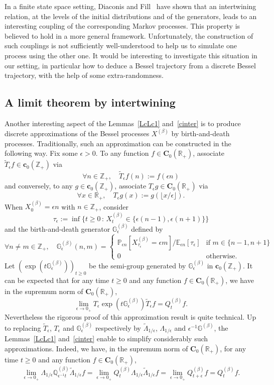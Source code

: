 \documentclass[AHL,Unicode,longabstracts]{cedram}
\newcommand{\df}{\mathrel{:=}}
\newcommand{\EE}{\mathbb{E}}
\newcommand{\PP}{\mathbb{P}}
\newcommand{\RR}{\mathbb{R}}
\newcommand{\ZZ}{\mathbb{Z}}
\newcommand{\ri}{\rightarrow}
\newcommand{\wi}{\widetilde}
\newcommand{\st}{\,:\,}
\newcommand{\dBg}{{\discret{G}}}
\newcommand{\dBs}{{\discret{Q}}}
\newcommand{\Bs}{Q}
\newcommand{\esC}{\mathbf{C}}
\newcommand{\esc}{\mathbf{c}}
\newcommand{\discret}[1]{\mathds{#1}}
\let\oldforall\forall
\renewcommand*{\forall}{\mathrel{\oldforall}}
\begin{document}
\begin{rema}
In a finite state space setting, Diaconis and Fill~\cite{MR1071805} have shown that an intertwining relation, at the levels of the initial distributions and of the generators, leads to an interesting coupling of the corresponding Markov processes. This property is believed to hold in a more general framework. Unfortunately, the construction of such couplings is not sufficiently well-understood to help us to simulate one process using the other one. It would be interesting to investigate this situation in our setting, in particular how to deduce a Bessel trajectory from a discrete Bessel trajectory, with the help of some extra-randomness.
\end{rema}

\subsection{A limit theorem by intertwining}\label{altbi}

Another interesting aspect of the Lemmas~\ref{LcLc1} and~\ref{cinter} is to produce discrete approximations of the Bessel processes $X^{(\beta)}$ by birth-and-death processes. Traditionally, such an approximation can be constructed in the following way. Fix some $\epsilon>0$. To any function $f\in \esC_0(\RR_+)$, associate $\wi T_\epsilon f\in \esc_0(\ZZ_+)$ via
\[
\forall n\in\ZZ_+,\quad \wi T_\epsilon f(n)\df f(\epsilon n)
\]
and conversely, to any $g\in \esc_0(\ZZ_+)$, associate $ T_\epsilon g\in \esC_0(\RR_+)$ via
\[
\forall x\in\RR_+,\quad T_\epsilon g(x)\df g(\lfloor x/\epsilon \rfloor).
\]
When $X^{(\beta)}_0=\epsilon n$ with $n\in\ZZ_+$, consider
\[
\tau_\epsilon\df \inf\{t\geq 0\st X^{(\beta)}_t\in\{\epsilon(n-1),\epsilon(n+1)\}\}
\]
and the birth-and-death generator $\dBg_\epsilon^{(\beta)}$ defined by
\[
\forall n\not= m\in\ZZ_+,\quad
\dBg_\epsilon^{(\beta)}(n,m)=
\begin{cases}
\PP_{\epsilon n}[X_{\tau_\epsilon}^{(\beta)}=\epsilon m]/\EE_{\epsilon n}[\tau_\epsilon]&\text{if $m\in\{n-1,n+1\}$}\\
0&\text{otherwise.}
\end{cases}
\]
Let $(\exp(t\dBg_\epsilon^{(\beta)}))_{t\geq 0}$ be the semi-group generated by $\dBg_\epsilon^{(\beta)}$ in $ \esc_0(\ZZ_+)$. It can be expected that for any time $t\geq 0$ and any function $f\in \esC_0(\RR_+)$, we have in the supremum norm of $\esC_0(\RR_+)$,
\[
\lim_{\epsilon\ri 0_+} T_\epsilon \exp(t\dBg_\epsilon^{(\beta)}) \wi T_\epsilon f=
\Bs^{(\beta)}_t f.
\]
Nevertheless the rigorous proof of this approximation result is quite technical. Up to replacing $\wi T_\epsilon$, $ T_\epsilon$ and $\dBg_\epsilon^{(\beta)}$ respectively by $\wi\Lambda_{1/\epsilon}$, $\Lambda_{1/\epsilon}$ and $\epsilon^{-1}\dBg^{(\beta)}$, the Lemmas~\ref{LcLc1} and~\ref{cinter} enable to simplify considerably such approximations. Indeed, we have, in the supremum norm of $\esC_0(\RR_+)$, for any time $t\geq 0$ and any function $f\in \esC_0(\RR_+)$,
\[
\lim_{\epsilon\ri 0_+}
\Lambda_{1/\epsilon} \dBs_{\epsilon^{-1}t}^{(\beta)} \wi\Lambda_{1/\epsilon} f=
\lim_{\epsilon\ri 0_+}
\Bs^{(\beta)}_t \Lambda_{1/\epsilon}\wi\Lambda_{1/\epsilon}f=\lim_{\epsilon\ri 0_+}
\Bs^{(\beta)}_{t+\epsilon}f=
\Bs^{(\beta)}_t f.
\]
\end{document}
